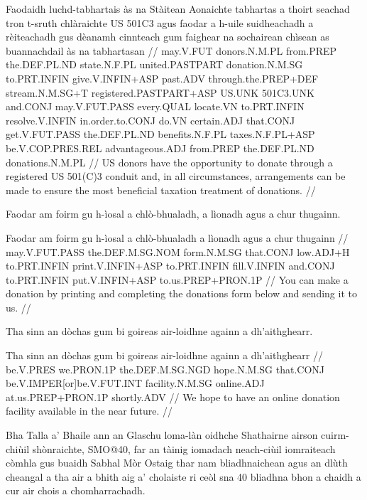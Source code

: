 \documentclass[a4paper,10pt]{article}
\begin{document}
\vspace{4mm}
\gla Faodaidh luchd-tabhartais às na Stàitean Aonaichte tabhartas a thoirt seachad tron t-sruth chlàraichte US 501C3 agus faodar {a h-uile} suidheachadh a rèiteachadh gus dèanamh cinnteach gum faighear na sochairean chìsean as buannachdail às na tabhartasan  //
\glb may.V.FUT donors.N.M.PL from.PREP the.DEF.PL.ND state.N.F.PL united.PASTPART donation.N.M.SG to.PRT.INFIN give.V.INFIN+ASP past.ADV through.the.PREP+DEF stream.N.M.SG+T registered.PASTPART+ASP US.UNK 501C3.UNK and.CONJ may.V.FUT.PASS every.QUAL locate.VN to.PRT.INFIN resolve.V.INFIN in.order.to.CONJ do.VN certain.ADJ that.CONJ get.V.FUT.PASS the.DEF.PL.ND benefits.N.F.PL taxes.N.F.PL+ASP be.V.COP.PRES.REL advantageous.ADJ from.PREP the.DEF.PL.ND donations.N.M.PL  //
\glft US donors have the opportunity to donate through a registered US 501(C)3 conduit and, in all circumstances, arrangements can be made to ensure the most beneficial taxation treatment of donations. //
\endgl
\xe

\ex
\begingl
\glpre Faodar am foirm gu h-ìosal a chlò-bhualadh, a lìonadh agus a chur thugainn. 

\vspace{4mm}
\gla Faodar am foirm gu h-ìosal a chlò-bhualadh a lìonadh agus a chur thugainn  //
\glb may.V.FUT.PASS the.DEF.M.SG.NOM form.N.M.SG that.CONJ low.ADJ+H to.PRT.INFIN print.V.INFIN+ASP to.PRT.INFIN fill.V.INFIN and.CONJ to.PRT.INFIN put.V.INFIN+ASP to.us.PREP+PRON.1P  //
\glft You can make a donation by printing and completing the donations form below and sending it to us. //
\endgl
\xe

\ex
\begingl
\glpre Tha sinn an dòchas gum bi goireas air-loidhne againn a dh'aithghearr. 

\vspace{4mm}
\gla Tha sinn an dòchas gum bi goireas air-loidhne againn {a dh'aithghearr}  //
\glb be.V.PRES we.PRON.1P the.DEF.M.SG.NGD hope.N.M.SG that.CONJ be.V.IMPER[or]be.V.FUT.INT facility.N.M.SG online.ADJ at.us.PREP+PRON.1P shortly.ADV  //
\glft We hope to have an online donation facility available in the near future. //
\endgl
\xe

\ex
\begingl
\glpre Bha Talla a' Bhaile ann an Glaschu loma-làn oidhche Shathairne airson cuirm-chiùil shònraichte, SMO@40, far an tàinig iomadach neach-ciùil iomraiteach còmhla gus buaidh Sabhal Mòr Ostaig thar nam bliadhnaichean agus an dlùth cheangal a tha air a bhith aig a' cholaiste ri ceòl sna 40 bliadhna bhon a chaidh a cur air chois a chomharrachadh. 
\end{document}

